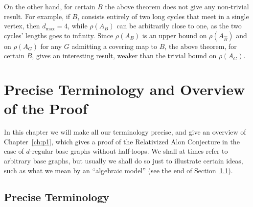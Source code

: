\documentclass{memo-l}
\theoremstyle{plain}
\theoremstyle{definition}
\numberwithin{section}{chapter}
\numberwithin{equation}{chapter}
\theoremstyle{plain}
\theoremstyle{definition}
\begin{document}
On the other hand, for certain $B$ the above theorem does not give
any non-trivial result.
For example, if $B$, consists entirely
of two long cycles that
meet in a single vertex, then $d_{\max{}}=4$, while
$\rho(A_B)$ can be arbitrarily close to one, as the two cycles' lengths
goes to infinity.  Since $\rho(A_B)$ is an upper bound
on $\rho(A_{\widehat B})$ and on $\rho(A_G)$ for any $G$ admitting a covering
map to $B$, the above theorem, for certain $B$, gives
an interesting result, weaker than the trivial bound on $\rho(A_G)$.




% 



\chapter{Precise Terminology and Overview of the Proof}
\label{ch:p0.5}



In this chapter we will make all our terminology precise, and
give an overview of Chapter~\ref{ch:p1}, which gives a proof 
of the Relativized Alon Conjecture in the case of $d$-regular base graphs
without half-loops.
We shall at times refer to arbitrary base graphs, but usually we
shall do so just to illustrate certain ideas, such as what we 
mean by an ``algebraic model'' (see the end of Section~\ref{se:p0-precise}).

\section{Precise Terminology}
\label{se:p0-precise}
\end{document}

